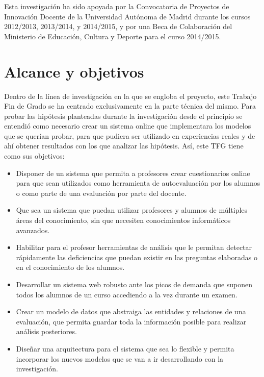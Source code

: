Esta investigación ha sido apoyada por la Convocatoria de Proyectos de Innovación Docente de la Universidad Autónoma de Madrid durante los cursos 2012/2013, 2013/2014, y 2014/2015, y por una Beca de Colaboración del Ministerio de Educación, Cultura y Deporte para el curso 2014/2015.

\section{Alcance y objetivos}


Dentro de la línea de investigación en la que se engloba el proyecto, este Trabajo Fin de Grado se ha centrado exclusivamente en la parte técnica del mismo. Para probar las hipótesis planteadas durante la investigación desde el principio se entendió como necesario crear un sistema online que implementara los modelos que se querían probar, para que pudiera ser utilizado en experiencias reales y de ahí obtener resultados con los que analizar las hipótesis. Así, este TFG tiene como sus objetivos:

\begin{itemize}
	\item Disponer de un sistema que permita a profesores crear cuestionarios online para que sean utilizados como herramienta de autoevaluación por los alumnos o como parte de una evaluación por parte del docente.
	\item Que sea un sistema que puedan utilizar profesores y alumnos de múltiples áreas del conocimiento, sin que necesiten conocimientos informáticos avanzados.
	\item Habilitar para el profesor herramientas de análisis que le permitan detectar rápidamente las deficiencias que puedan existir en las preguntas  elaboradas o en el conocimiento de los alumnos.
	\item Desarrollar un sistema web robusto ante los picos de demanda que suponen todos los alumnos de un curso accediendo a la vez durante un examen.
	\item Crear un modelo de datos que abstraiga las entidades y relaciones de una evaluación, que permita guardar toda la información posible para realizar análisis posteriores.
	\item Diseñar una arquitectura para el sistema que sea lo flexible y permita incorporar los nuevos modelos que se van a ir desarrollando con la investigación.
\end{itemize}

